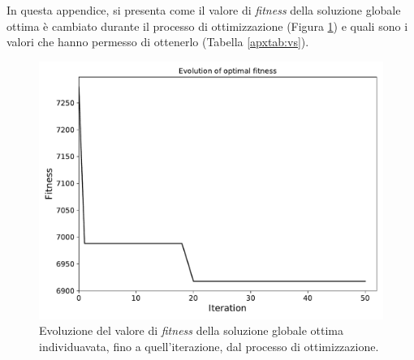 In questa appendice, si presenta come il valore di \textit{fitness} della soluzione globale ottima è cambiato durante il processo di ottimizzazione (Figura \ref{apxfig:optimalfitness}) e quali sono i valori che hanno permesso di ottenerlo (Tabella \ref{apxtab:vs}). 
\begin{figure}
	\centering
	\includegraphics[width=0.9\linewidth]{images/optimal_fitness}
	\caption{Evoluzione del valore di \textit{fitness} della soluzione globale ottima individuavata, fino a quell'iterazione, dal processo di ottimizzazione.}
	\label{apxfig:optimalfitness}
\end{figure}
